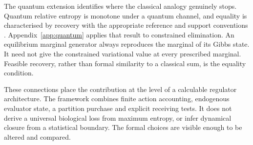 The quantum extension identifies where the classical analogy genuinely stops. Quantum relative entropy is monotone under a quantum channel, and equality is characterised by recovery with the appropriate reference and support conventions \cite{PETZ200347a4ef,Junge20189e4744}. Appendix~\ref{app:quantum} applies that result to constrained elimination. An equilibrium marginal generator always reproduces the marginal of its Gibbs state. It need not give the constrained variational value at every prescribed marginal. Feasible recovery, rather than formal similarity to a classical sum, is the equality condition.

These connections place the contribution at the level of a calculable regulator architecture. The framework combines finite action accounting, endogenous evaluator state, a partition purchase and explicit receiving tests. It does not derive a universal biological loss from maximum entropy, or infer dynamical closure from a statistical boundary. The formal choices are visible enough to be altered and compared.
